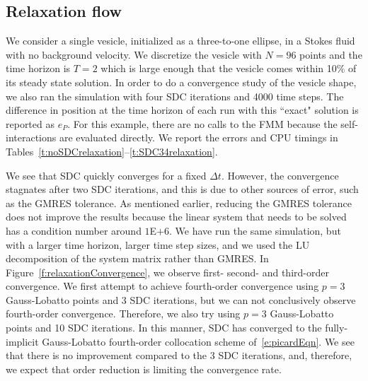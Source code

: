 %
%
%

\subsection{Relaxation flow}

We consider a single vesicle, initialized as a three-to-one ellipse, in
a Stokes fluid with no background velocity.  We discretize the vesicle
with $N=96$ points and the time horizon is $T=2$ which is large enough
that the vesicle comes within 10\% of its steady state solution.  In
order to do a convergence study of the vesicle shape, we also ran the
simulation with four SDC iterations and 4000 time steps.  The
difference in position at the time horizon of each run with this
``exact" solution is reported as $e_{P}$.  For this example, there are
no calls to the FMM because the self-interactions are evaluated
directly.  We report the errors and CPU timings in
Tables~\ref{t:noSDCrelaxation}--\ref{t:SDC34relaxation}.

We see that SDC quickly converges for a fixed $\Delta t$.  However, the
convergence stagnates after two SDC iterations, and this is due to other
sources of error, such as the GMRES tolerance.  As mentioned earlier,
reducing the GMRES tolerance does not improve the results because the
linear system that needs to be solved has a condition number around
$1$E$+6$.  We have run the same simulation, but with a larger time
horizon, larger time step sizes, and we used the LU decomposition of the
system matrix rather than GMRES.  In
Figure~\ref{f:relaxationConvergence}, we observe first- second- and
third-order convergence.  We first attempt to achieve fourth-order
convergence using $p=3$ Gauss-Lobatto points and 3 SDC iterations, but
we can not conclusively observe fourth-order convergence.  Therefore, we
also try using $p=3$ Gauss-Lobatto points and 10 SDC iterations.  In
this manner, SDC has converged to the fully-implicit Gauss-Lobatto
fourth-order collocation scheme of~\eqref{e:picardEqn}.  We see that
there is no improvement compared to the 3 SDC iterations, and,
therefore, we expect that order reduction is limiting the convergence
rate.

